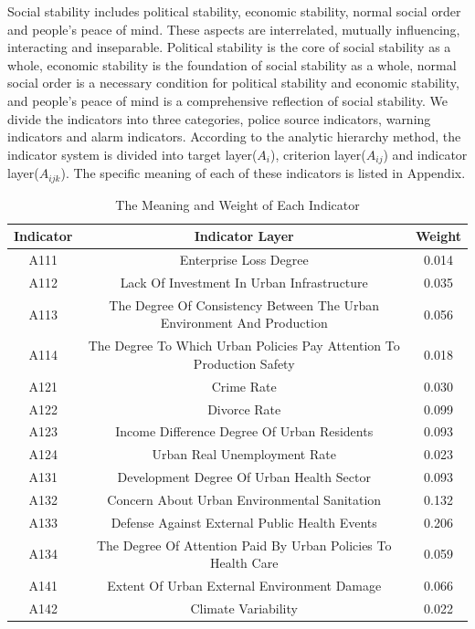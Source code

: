 \documentclass[12pt]{article}  %
\begin{document}
Social stability includes political stability, economic stability, normal social order and people's peace of mind. These aspects are interrelated, mutually influencing, interacting and inseparable. Political stability is the core of social stability as a whole, economic stability is the foundation of social stability as a whole, normal social order is a necessary condition for political stability and economic stability, and people's peace of mind is a comprehensive reflection of social stability. We divide the indicators into three categories, police source indicators, warning indicators and alarm indicators. According to the analytic hierarchy method, the indicator system is divided into target layer($A_i$), criterion layer($A_{ij}$) and indicator layer($A_{ijk}$). The specific meaning of each of these indicators is listed in Appendix.
\begin{table}[!ht]\small
    \centering
    \caption{The Meaning and Weight of Each Indicator}
    \begin{tabular}{ccc}
        \hline
        Indicator & Indicator Layer &Weight\\ \hline
        A111 & Enterprise Loss Degree &0.014 \\ 
        A112 & Lack Of Investment In Urban Infrastructure &0.035 \\ 
        A113 & The Degree Of Consistency Between The Urban Environment And Production &0.056 \\ 
        A114 & The Degree To Which Urban Policies Pay Attention To Production Safety &0.018 \\ 
        A121 & Crime Rate &0.030 \\ 
        A122 & Divorce Rate &0.099 \\ 
        A123 & Income Difference Degree Of Urban Residents &0.093 \\ 
        A124 & Urban Real Unemployment Rate &0.023 \\ 
        A131 & Development Degree Of Urban Health Sector&0.093  \\ 
        A132 & Concern About Urban Environmental Sanitation  &0.132\\ 
        A133 & Defense Against External Public Health Events &0.206 \\ 
        A134 & The Degree Of Attention Paid By Urban Policies To Health Care &0.059 \\ 
        A141 & Extent Of Urban External Environment Damage&0.066  \\ 
        A142 & Climate Variability &0.022 \\ 

\end{tabular}
\end{table}
\end{document}
